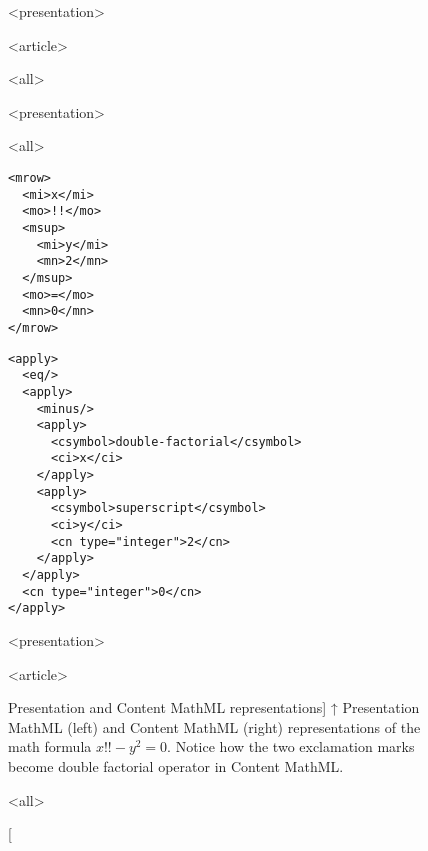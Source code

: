 \begin{figure}

\begingroup

\mode
<presentation>

\vspace*{-4.1em}

\mode
<article>

\makeatletter
\let\bfseries\thesis@bfseries@old
\makeatother

\mode
<all>

\centering
\begin{minipage}{0.27\textwidth}

\mode
<presentation>

\vspace*{2.5em}

\mode
<all>

\begin{verbatim}
<mrow>
  <mi>x</mi>
  <mo>!!</mo>
  <msup>
    <mi>y</mi>
    <mn>2</mn>
  </msup>
  <mo>=</mo>
  <mn>0</mn>
</mrow>
\end{verbatim}
\end{minipage}%
\begin{minipage}{0.73\textwidth}
\begin{verbatim}
<apply>
  <eq/>
  <apply>
    <minus/>
    <apply>
      <csymbol>double-factorial</csymbol>
      <ci>x</ci>
    </apply>
    <apply>
      <csymbol>superscript</csymbol>
      <ci>y</ci>
      <cn type="integer">2</cn>
    </apply>
  </apply>
  <cn type="integer">0</cn>
</apply>
\end{verbatim}
\end{minipage}
\endgroup

\mode
<presentation>

\caption
  {Presentation MathML (left) and Content MathML (right)
   representations of $x!! - y^2 = 0$.}

\mode
<article>

\caption
  [Presentation and Content MathML representations]%
  {↑ Presentation MathML (left) and Content MathML (right)
   representations of the math formula $x!! - y^2 = 0$. Notice how the two
   exclamation marks become double factorial operator in Content MathML.
   \cite[Figure 2]{novotny2020three}}

\mode
<all>

\label{fig:pmml-and-cmml}
\end{figure}
